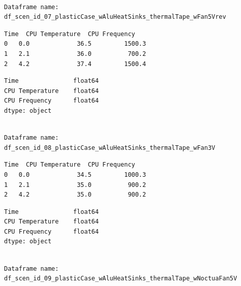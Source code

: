 \documentclass[10pt,parskip=half,
toc=sectionentrywithdots,
bibliography=totocnumbered,
captions=tableheading,numbers=noendperiod]{scrartcl}
\begin{document}
\begin{lstlisting}[language={},postbreak={},numbers=none,xrightmargin=7pt,belowskip=5pt,aboveskip=5pt,breakindent=0pt]

Dataframe name: df_scen_id_07_plasticCase_wAluHeatSinks_thermalTape_wFan5Vrev

\end{lstlisting}

\begin{lstlisting}[language={},postbreak={},numbers=none,xrightmargin=7pt,breakindent=0pt,aboveskip=5pt,belowskip=5pt]
   Time  CPU Temperature  CPU Frequency
0   0.0             36.5         1500.3
1   2.1             36.0          700.2
2   4.2             37.4         1500.4
\end{lstlisting}

\begin{lstlisting}[language={},postbreak={},numbers=none,xrightmargin=7pt,breakindent=0pt,aboveskip=5pt,belowskip=5pt]
Time               float64
CPU Temperature    float64
CPU Frequency      float64
dtype: object
\end{lstlisting}

\begin{lstlisting}[language={},postbreak={},numbers=none,xrightmargin=7pt,belowskip=5pt,aboveskip=5pt,breakindent=0pt]

Dataframe name: df_scen_id_08_plasticCase_wAluHeatSinks_thermalTape_wFan3V

\end{lstlisting}

\begin{lstlisting}[language={},postbreak={},numbers=none,xrightmargin=7pt,breakindent=0pt,aboveskip=5pt,belowskip=5pt]
   Time  CPU Temperature  CPU Frequency
0   0.0             34.5         1000.3
1   2.1             35.0          900.2
2   4.2             35.0          900.2
\end{lstlisting}

\begin{lstlisting}[language={},postbreak={},numbers=none,xrightmargin=7pt,breakindent=0pt,aboveskip=5pt,belowskip=5pt]
Time               float64
CPU Temperature    float64
CPU Frequency      float64
dtype: object
\end{lstlisting}

\begin{lstlisting}[language={},postbreak={},numbers=none,xrightmargin=7pt,belowskip=5pt,aboveskip=5pt,breakindent=0pt]

Dataframe name: df_scen_id_09_plasticCase_wAluHeatSinks_thermalTape_wNoctuaFan5V

\end{lstlisting}
\end{document}
